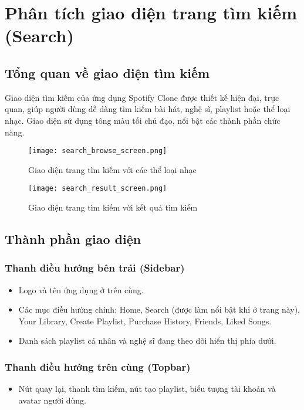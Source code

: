 \documentclass{book}
\let\oldsection\section
\renewcommand{\section}{\clearpage\oldsection}
\begin{document}
\section{Phân tích giao diện trang tìm kiếm (Search)}

\subsection{Tổng quan về giao diện tìm kiếm}
Giao diện tìm kiếm của ứng dụng Spotify Clone được thiết kế hiện đại, trực quan, giúp người dùng dễ dàng tìm kiếm bài hát, nghệ sĩ, playlist hoặc thể loại nhạc. Giao diện sử dụng tông màu tối chủ đạo, nổi bật các thành phần chức năng.

\begin{figure}[h!]
\centering
\texttt{[image: search\_browse\_screen.png]} %
\caption{Giao diện trang tìm kiếm với các thể loại nhạc}
\label{fig:search_browse}
\end{figure}

\begin{figure}[h!]
\centering
\texttt{[image: search\_result\_screen.png]} %
\caption{Giao diện trang tìm kiếm với kết quả tìm kiếm}
\label{fig:search_result}
\end{figure}

\subsection{Thành phần giao diện}

\subsubsection{Thanh điều hướng bên trái (Sidebar)}
\begin{itemize}
    \item Logo và tên ứng dụng ở trên cùng.
    \item Các mục điều hướng chính: Home, Search (được làm nổi bật khi ở trang này), Your Library, Create Playlist, Purchase History, Friends, Liked Songs.
    \item Danh sách playlist cá nhân và nghệ sĩ đang theo dõi hiển thị phía dưới.
\end{itemize}

\subsubsection{Thanh điều hướng trên cùng (Topbar)}
\begin{itemize}
    \item Nút quay lại, thanh tìm kiếm, nút tạo playlist, biểu tượng tài khoản và avatar người dùng.
\end{itemize}
\end{document}
